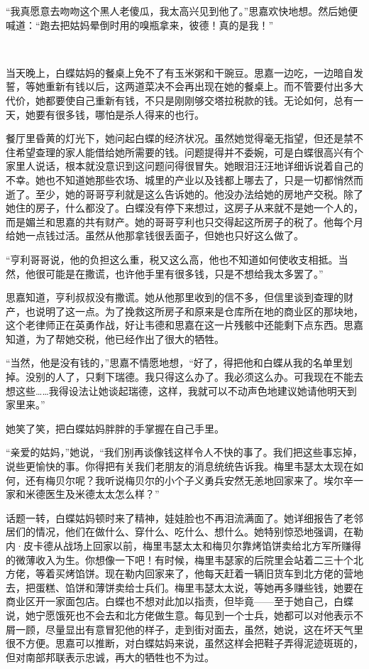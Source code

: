 \par “我真愿意去吻吻这个黑人老傻瓜，我太高兴见到他了。”思嘉欢快地想。然后她便喊道：“跑去把姑妈晕倒时用的嗅瓶拿来，彼德！真的是我！”
\par  
\par 当天晚上，白蝶姑妈的餐桌上免不了有玉米粥和干豌豆。思嘉一边吃，一边暗自发誓，等她重新有钱以后，这两道菜决不会再出现在她的餐桌上。而不管要付出多大代价，她都要使自己重新有钱，不只是刚刚够交塔拉税款的钱。无论如何，总有一天，她要有很多钱，哪怕是杀人得来的也行。
\par 餐厅里昏黄的灯光下，她问起白蝶的经济状况。虽然她觉得毫无指望，但还是禁不住希望查理的家人能借给她所需要的钱。问题提得并不委婉，可是白蝶很高兴有个家里人说话，根本就没意识到这问题问得很冒失。她眼泪汪汪地详细诉说着自己的不幸。她也不知道她那些农场、城里的产业以及钱都上哪去了，只是一切都悄然而逝了。至少，她的哥哥亨利就是这么告诉她的。他没办法给她的房地产交税。除了她住的房子，什么都没了。白蝶没有停下来想过，这房子从来就不是她一个人的，而是媚兰和思嘉的共有财产。她的哥哥亨利也只交得起这所房子的税了。他每个月给她一点钱过活。虽然从他那拿钱很丢面子，但她也只好这么做了。
\par “亨利哥哥说，他的负担这么重，税又这么高，他也不知道如何使收支相抵。当然，他很可能是在撒谎，也许他手里有很多钱，只是不想给我太多罢了。”
\par 思嘉知道，亨利叔叔没有撒谎。她从他那里收到的信不多，但信里谈到查理的财产，也说明了这一点。为了挽救这所房子和原来是仓库所在地的商业区的那块地，这个老律师正在英勇作战，好让韦德和思嘉在这一片残骸中还能剩下点东西。思嘉知道，为了帮她交税，他已经作出了很大的牺牲。
\par “当然，他是没有钱的，”思嘉不情愿地想，“好了，得把他和白蝶从我的名单里划掉。没别的人了，只剩下瑞德。我只得这么办了。我必须这么办。可我现在不能去想这些……我得设法让她谈起瑞德，这样，我就可以不动声色地建议她请他明天到家里来。”
\par 她笑了笑，把白蝶姑妈胖胖的手掌握在自己手里。
\par “亲爱的姑妈，”她说，“我们别再谈像钱这样令人不快的事了。我们把这些事忘掉，说些更愉快的事。你得把有关我们老朋友的消息统统告诉我。梅里韦瑟太太现在如何，还有梅贝尔呢？我听说梅贝尔的小个子义勇兵安然无恙地回家来了。埃尔辛一家和米德医生及米德太太怎么样？”
\par 话题一转，白蝶姑妈顿时来了精神，娃娃脸也不再泪流满面了。她详细报告了老邻居们的情况，他们在做什么、穿什么、吃什么、想什么。她特别惊恐地强调，在勒内·皮卡德从战场上回家以前，梅里韦瑟太太和梅贝尔靠烤馅饼卖给北方军所赚得的微薄收入为生。你想像一下吧！有时候，梅里韦瑟家的后院里会站着二三十个北方佬，等着买烤馅饼。现在勒内回家来了，他每天赶着一辆旧货车到北方佬的营地去，把蛋糕、馅饼和薄饼卖给士兵们。梅里韦瑟太太说，等她再多赚些钱，她要在商业区开一家面包店。白蝶也不想对此加以指责，但毕竟——至于她自己，白蝶说，她宁愿饿死也不会去和北方佬做生意。每见到一个士兵，她都可以对他表示不屑一顾，尽量显出有意冒犯他的样子，走到街对面去，虽然，她说，这在坏天气里很不方便。思嘉可以推断，对白蝶姑妈来说，虽然这样会把鞋子弄得泥迹斑斑的，但对南部邦联表示忠诚，再大的牺牲也不为过。
